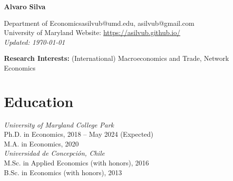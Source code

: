 \documentclass[11pt]{article}
\begin{document}
\begin{center}
\begin{Large} \bfseries Alvaro Silva\end{Large}
\end{center}


\vspace*{0.2in}
Department of Economics\hfill asilvub@umd.edu, asilvub@gmail.com \\
University of Maryland \hfill Website: \href{https://asilvub.github.io/}{https://asilvub.github.io/} \\
\hfill \emph{Updated: \today}\\

\vspace*{-0.1in}


\textbf{\normalsize Research Interests: } (International) Macroeconomics and Trade, Network Economics

\section*{Education}
{\itshape University of Maryland College Park}\\
Ph.D. in Economics, 2018 --  May 2024 (Expected)\\
M.A. in Economics, 2020 \\[-0.1in]

{\itshape Universidad de Concepci\'on, Chile}\\
M.Sc. in Applied Economics (with honors), 2016 \\
B.Sc. in Economics (with honors), 2013

\end{document}
